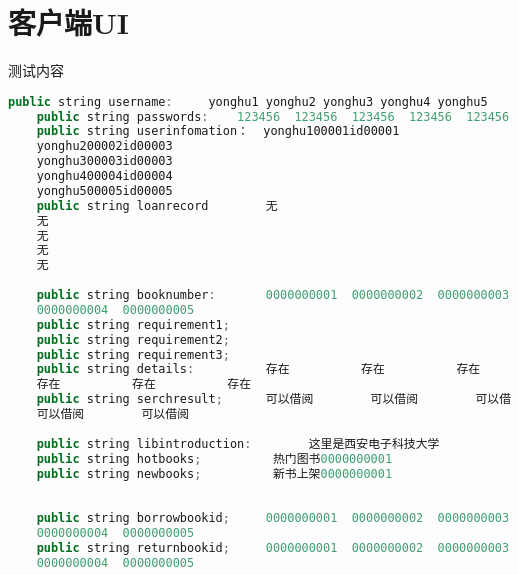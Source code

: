 \documentclass[UTF8]{report}
\begin{document}
    \chapter{客户端UI}
    测试内容
    \begin{lstlisting}[language=C++]
    public string username:     yonghu1 yonghu2 yonghu3 yonghu4 yonghu5
    public string passwords:    123456  123456  123456  123456  123456
    public string userinfomation：  yonghu100001id00001
    yonghu200002id00003
    yonghu300003id00003
    yonghu400004id00004
    yonghu500005id00005
    public string loanrecord		无
    无
    无
    无
    无
    
    public string booknumber:		0000000001	0000000002	0000000003	
    0000000004	0000000005
    public string requirement1;
    public string requirement2;
    public string requirement3;
    public string details:          存在			存在			存在
    存在			存在			存在
    public string serchresult;		可以借阅		可以借阅		可以借阅
    可以借阅		可以借阅
    
    public string libintroduction:        这里是西安电子科技大学
    public string hotbooks;			 热门图书0000000001
    public string newbooks;			 新书上架0000000001
    
    
    public string borrowbookid;		0000000001	0000000002	0000000003
    0000000004	0000000005
    public string returnbookid;		0000000001	0000000002	0000000003
    0000000004	0000000005
    \end{lstlisting}
    \begin{appendices}
        
    \end{appendices}
\end{document}
